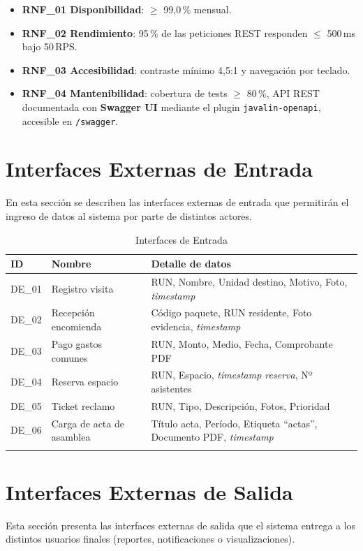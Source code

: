 \begin{itemize}
    \item \textbf{RNF\_01 Disponibilidad}: \(\ge\) 99{,}0\,\% mensual.
    \item \textbf{RNF\_02 Rendimiento}: 95\,\% de las peticiones REST responden \(\le\) 500\,ms bajo 50\,RPS.
    \item \textbf{RNF\_03 Accesibilidad}: contraste mínimo 4{,}5:1 y navegación por teclado.
    \item \textbf{RNF\_04 Mantenibilidad}: cobertura de tests \(\ge\) 80\,\%, API REST documentada con \textbf{Swagger UI} mediante el plugin \texttt{javalin-openapi}, accesible en \texttt{/swagger}.
\end{itemize}

\section{Interfaces Externas de Entrada}
En esta sección se describen las interfaces externas de entrada que permitirán el ingreso de datos al sistema por parte de distintos actores.

{\small
\begin{longtable}{|p{}|p{}|p{}|}
\hline
\textbf{ID} & \textbf{Nombre} & \textbf{Detalle de datos} \\ \hline
DE\_01 & Registro visita & RUN, Nombre, Unidad destino, Motivo, Foto, \textit{timestamp} \\ \hline
DE\_02 & Recepción encomienda & Código paquete, RUN residente, Foto evidencia, \textit{timestamp} \\ \hline
DE\_03 & Pago gastos comunes & RUN, Monto, Medio, Fecha, Comprobante PDF \\ \hline
DE\_04 & Reserva espacio & RUN, Espacio, \textit{timestamp reserva}, Nº asistentes \\ \hline
DE\_05 & Ticket reclamo & RUN, Tipo, Descripción, Fotos, Prioridad \\ \hline
DE\_06 & Carga de acta de asamblea & Título acta, Período, Etiqueta ``actas'', Documento PDF, \textit{timestamp} \\ \hline
\caption{Interfaces de Entrada}
\label{tab:entrada}
\end{longtable}
}

\section{Interfaces Externas de Salida}
Esta sección presenta las interfaces externas de salida que el sistema entrega a los distintos usuarios finales (reportes, notificaciones o visualizaciones).

